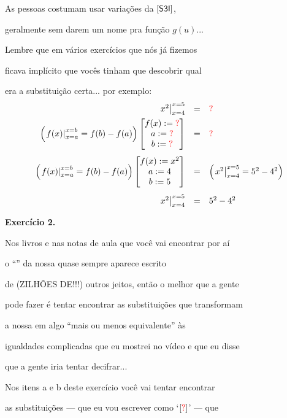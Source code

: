 \documentclass[oneside,12pt]{article}
\begin{document}
\newpage


As pessoas costumam usar variações da $\mathsf{[S3I]}$,

geralmente sem darem um nome pra função $g(u)$...


Lembre que em vários exercícios que nós já fizemos

ficava implícito que vocês tinham que descobrir qual

era a substituição certa... por exemplo:
%
$$\begin{array}{rcl}
  \difx{4}{5}{x^2} &=& \Rdq \\[5pt]
  \Ps{\difx{a}{b}{f(x)} = f(b)-f(a)} \bmat{f(x):=\Rdq \\ a:=\Rdq \\ b:=\Rdq} &=& \Rdq
  \\[20pt]
  \Ps{\difx{a}{b}{f(x)} = f(b)-f(a)} \bmat{f(x):=x^2  \\ a:=4    \\ b:=5} &=&
  \Ps{\difx{4}{5}{x^2} = 5^2-4^2} \\
  [20pt]
  \difx{4}{5}{x^2} &=& 5^2 - 4^2 \\
  \end{array}
$$


\newpage


{\bf Exercício 2.}

Nos livros e nas notas de aula que você vai encontrar por aí

o ``'' da nossa  quase sempre aparece escrito

de (ZILHÕES DE!!!) outros jeitos, então o melhor que a gente

pode fazer é tentar encontrar as substituições que transformam

a nossa  em algo ``mais ou menos equivalente'' às

igualdades complicadas que eu mostrei no vídeo e que eu disse

que a gente iria tentar decifrar...

\msk

Nos itens a e b deste exercício você vai tentar encontrar

as substituições --- que eu vou escrever como `$[\Rdq]$' --- que
\end{document}
